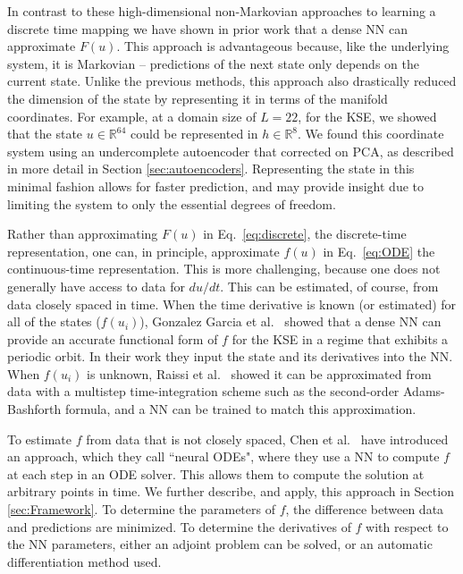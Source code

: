 \documentclass[preprint,aps,pre,letterpaper,onecolumn,superscriptaddress]{revtex4-2} %
\newcommand{\MDG}[1]{\textcolor{magenta}{*** #1 ***}}
\newcommand{\AL}[1]{\textcolor{ao(english)}{*** #1 ***}}
\begin{document}
In contrast to these high-dimensional non-Markovian approaches to learning a discrete time mapping we have shown in prior work \cite{Linot2020} that a dense NN can approximate $F(u)$. This approach is advantageous because, like the underlying system, it is Markovian -- predictions of the next state only depends on the current state. Unlike the previous methods, this approach also drastically reduced the dimension of the state by representing it in terms of the manifold coordinates. For example, at a domain size of $L=22$, for the KSE, we showed that the state $u\in\mathbb{R}^{64}$ could be represented in $h\in\mathbb{R}^8$. We found this coordinate system using an undercomplete autoencoder that corrected on PCA, as described in more detail in Section \ref{sec:autoencoders}. Representing the state in this minimal fashion allows for faster prediction, and may provide insight due to limiting the system to only the essential degrees of freedom.

Rather than approximating $F(u)$ in Eq.\ \ref{eq:discrete}, the discrete-time representation, one can, in principle, approximate $f(u)$ in Eq.\ \ref{eq:ODE} the continuous-time representation.
 This is more challenging, because one does not generally have access to data for $du/dt$. This can be estimated, of course, from data closely spaced in time.  
 When the time derivative is known (or estimated) for all of the states ($f(u_i)$), Gonzalez Garcia et al.\ \cite{Gonzalez-Garcia1998} showed that a dense NN can provide an accurate functional form of $f$ for the KSE in a regime that exhibits a periodic orbit. In their work they input the state and its derivatives into the NN.
When $f(u_i)$ is unknown, Raissi et al.\ \cite{Raissi2018} 
showed it can be approximated from data with a multistep time-integration scheme such as the second-order Adams-Bashforth formula, and a NN can be trained to match this approximation. %

To estimate $f$ from data that is not closely spaced, Chen et al.\ \cite{Chen2019} have introduced an approach, which they call ``neural ODEs", where they use a NN to compute $f$ at each step in an ODE solver. This allows them to compute the solution at arbitrary points in time. We further describe, and apply, this approach in Section \ref{sec:Framework}. To determine the parameters of $f$, the difference between data and predictions are minimized. To determine the derivatives of $f$ with respect to the NN parameters, either an adjoint problem can be solved, or an automatic differentiation method used. 
\end{document}
